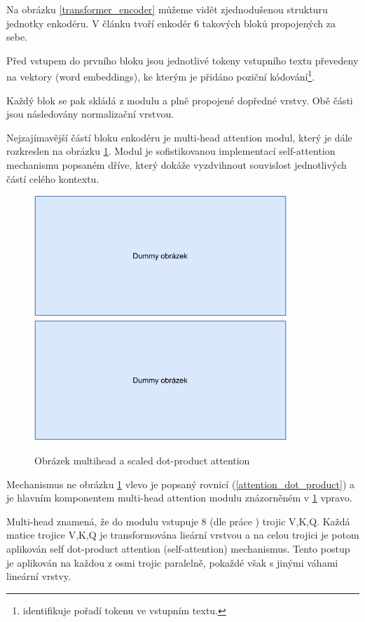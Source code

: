 Na obrázku \ref{transformer_encoder} můžeme vidět zjednodušenou strukturu jednotky enkodéru. V článku \cite{Transformers} tvoří enkodér 6 takových bloků propojených za sebe.\par
Před vstupem do prvního bloku jsou jednotlivé tokeny vstupního textu převedeny na vektory (word embeddings), ke kterým je přidáno poziční kódování\footnote{identifikuje pořadí tokenu ve vstupním textu.}.\par
Každý blok se pak skládá z  modulu a plně propojené dopředné vrstvy. Obě části jsou následovány normalizační vrstvou.\par
Nejzajímavější částí bloku enkodéru je multi-head attention modul, který je dále rozkreslen na obrázku \ref{multihead}. Modul je sofistikovanou implementací self-attention mechanismu popsaném dříve, který dokáže vyzdvihnout souvislost jednotlivých částí celého kontextu. 

\begin{figure}[hbt]
	\centering
	\includegraphics[width=0.45\linewidth, height=1.8in]{obrazky/dummy_pic.pdf}\hfill
	\includegraphics[width=0.45\linewidth, height=1.8in]{obrazky/dummy_pic.pdf}\hfill
	\caption{Obrázek multihead a scaled dot-product attention}
	\label{multihead}
\end{figure}

Mechanismus ne obrázku \ref{multihead} vlevo je popsaný rovnicí (\ref{attention_dot_product}) a je hlavním komponentem multi-head attention modulu znázorněném v \ref{multihead} vpravo.\par
Multi-head znamená, že do modulu vstupuje 8 (dle práce \cite{Transformers}) trojic V,K,Q. Každá matice trojice V,K,Q je transformována lieární vrstvou a na celou trojici je potom aplikován self dot-product attention (self-attention) mechanismus. Tento postup je aplikován na každou z osmi trojic paralelně, pokaždé však s jinými váhami lineární vrstvy.

